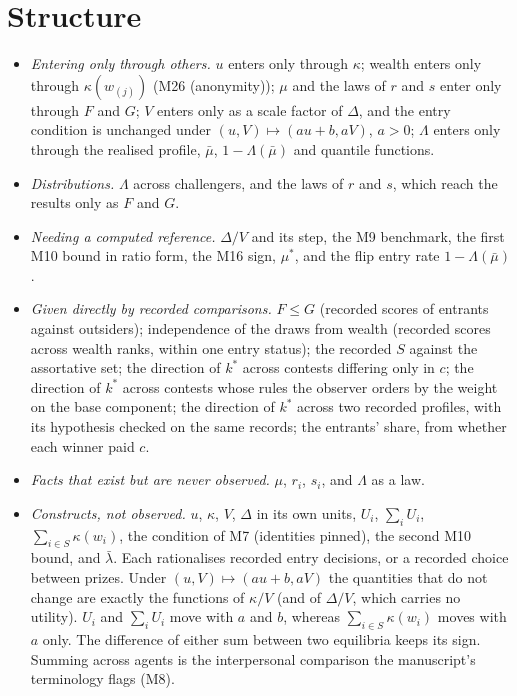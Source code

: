 \documentclass[11pt]{article}
\begin{document}
\section*{Structure}

\begin{itemize}
\item \emph{Entering only through others.} $u$ enters only through $\kappa$;
  wealth enters only through $\kappa(w_{(j)})$ (M26 (anonymity));
  $\mu$ and the laws of $r$ and $s$ enter only through $F$ and $G$; $V$
  enters only as a scale factor of $\Delta$, and the entry condition is
  unchanged under $(u,V)\mapsto(au+b,aV)$, $a>0$; $\Lambda$ enters only
  through the realised profile, $\bar\mu$, $1-\Lambda(\bar\mu)$ and quantile
  functions.
\item \emph{Distributions.} $\Lambda$ across challengers, and the laws of $r$
  and $s$, which reach the results only as $F$ and $G$.
\item \emph{Needing a computed reference.} $\Delta/V$ and its step, the M9
  benchmark, the first M10 bound in ratio form, the M16 sign, $\mu^*$, and the
  flip entry rate $1-\Lambda(\bar\mu)$.
\item \emph{Given directly by recorded comparisons.} $F\le G$ (recorded
  scores of entrants against outsiders); independence of the draws from
  wealth (recorded scores across wealth ranks, within one entry status);
  the recorded $S$ against the assortative set; the direction of $k^*$ across
  contests differing only in $c$; the direction of $k^*$ across contests whose
  rules the observer orders by the weight on the base component; the
  direction of $k^*$ across two recorded profiles, with its hypothesis checked
  on the same records; the entrants' share, from whether each winner paid
  $c$.
\item \emph{Facts that exist but are never observed.} $\mu$, $r_i$, $s_i$,
  and $\Lambda$ as a law.
\item \emph{Constructs, not observed.} $u$, $\kappa$, $V$, $\Delta$ in its
  own units, $U_i$, $\sum_iU_i$, $\sum_{i\in S}\kappa(w_i)$, the condition of
  M7 (identities pinned), the second M10 bound, and
  $\bar\lambda$. Each rationalises recorded entry decisions, or a recorded
  choice between prizes. Under $(u,V)\mapsto(au+b,aV)$ the quantities that do
  not change are exactly the functions of $\kappa/V$ (and of $\Delta/V$, which
  carries no utility). $U_i$ and $\sum_iU_i$ move with $a$ and $b$, whereas
  $\sum_{i\in S}\kappa(w_i)$ moves with $a$ only. The difference of either sum
  between two equilibria keeps its sign. Summing across agents is the
  interpersonal comparison the manuscript's terminology flags (M8).
\end{itemize}
\end{document}
